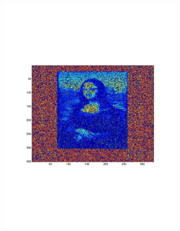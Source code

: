 \begin{figure}[h!tbp]
    \centering
    \begin{subfigure}[a]{0.3\textwidth}
        \includegraphics[width=\textwidth]{img/p5_m1_lam1.pdf}
    \end{subfigure}
    \begin{subfigure}[b]{0.3\textwidth}

\end{subfigure}
\end{figure}
